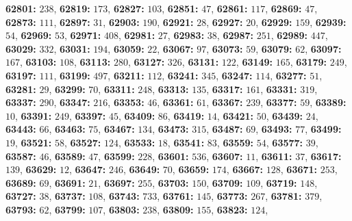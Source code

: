 \textsf{\bfseries 62801:} $238$, \textsf{\bfseries 62819:} $173$, \textsf{\bfseries 62827:} $103$, \textsf{\bfseries 62851:} $47$, \textsf{\bfseries 62861:} $117$, \textsf{\bfseries 62869:} $47$, \textsf{\bfseries 62873:} $111$, \textsf{\bfseries 62897:} $31$, \textsf{\bfseries 62903:} $190$, \textsf{\bfseries 62921:} $28$, \textsf{\bfseries 62927:} $20$, \textsf{\bfseries 62929:} $159$, \textsf{\bfseries 62939:} $54$, \textsf{\bfseries 62969:} $53$, \textsf{\bfseries 62971:} $408$, \textsf{\bfseries 62981:} $27$, \textsf{\bfseries 62983:} $38$, \textsf{\bfseries 62987:} $251$, \textsf{\bfseries 62989:} $447$, \textsf{\bfseries 63029:} $332$, \textsf{\bfseries 63031:} $194$, \textsf{\bfseries 63059:} $22$, \textsf{\bfseries 63067:} $97$, \textsf{\bfseries 63073:} $59$, \textsf{\bfseries 63079:} $62$, \textsf{\bfseries 63097:} $167$, \textsf{\bfseries 63103:} $108$, \textsf{\bfseries 63113:} $280$, \textsf{\bfseries 63127:} $326$, \textsf{\bfseries 63131:} $122$, \textsf{\bfseries 63149:} $165$, \textsf{\bfseries 63179:} $249$, \textsf{\bfseries 63197:} $111$, \textsf{\bfseries 63199:} $497$, \textsf{\bfseries 63211:} $112$, \textsf{\bfseries 63241:} $345$, \textsf{\bfseries 63247:} $114$, \textsf{\bfseries 63277:} $51$, \textsf{\bfseries 63281:} $29$, \textsf{\bfseries 63299:} $70$, \textsf{\bfseries 63311:} $248$, \textsf{\bfseries 63313:} $135$, \textsf{\bfseries 63317:} $161$, \textsf{\bfseries 63331:} $319$, \textsf{\bfseries 63337:} $290$, \textsf{\bfseries 63347:} $216$, \textsf{\bfseries 63353:} $46$, \textsf{\bfseries 63361:} $61$, \textsf{\bfseries 63367:} $239$, \textsf{\bfseries 63377:} $59$, \textsf{\bfseries 63389:} $10$, \textsf{\bfseries 63391:} $249$, \textsf{\bfseries 63397:} $45$, \textsf{\bfseries 63409:} $86$, \textsf{\bfseries 63419:} $14$, \textsf{\bfseries 63421:} $50$, \textsf{\bfseries 63439:} $24$, \textsf{\bfseries 63443:} $66$, \textsf{\bfseries 63463:} $75$, \textsf{\bfseries 63467:} $134$, \textsf{\bfseries 63473:} $315$, \textsf{\bfseries 63487:} $69$, \textsf{\bfseries 63493:} $77$, \textsf{\bfseries 63499:} $19$, \textsf{\bfseries 63521:} $58$, \textsf{\bfseries 63527:} $124$, \textsf{\bfseries 63533:} $18$, \textsf{\bfseries 63541:} $83$, \textsf{\bfseries 63559:} $54$, \textsf{\bfseries 63577:} $39$, \textsf{\bfseries 63587:} $46$, \textsf{\bfseries 63589:} $47$, \textsf{\bfseries 63599:} $228$, \textsf{\bfseries 63601:} $536$, \textsf{\bfseries 63607:} $11$, \textsf{\bfseries 63611:} $37$, \textsf{\bfseries 63617:} $139$, \textsf{\bfseries 63629:} $12$, \textsf{\bfseries 63647:} $246$, \textsf{\bfseries 63649:} $70$, \textsf{\bfseries 63659:} $174$, \textsf{\bfseries 63667:} $128$, \textsf{\bfseries 63671:} $253$, \textsf{\bfseries 63689:} $69$, \textsf{\bfseries 63691:} $21$, \textsf{\bfseries 63697:} $255$, \textsf{\bfseries 63703:} $150$, \textsf{\bfseries 63709:} $109$, \textsf{\bfseries 63719:} $148$, \textsf{\bfseries 63727:} $38$, \textsf{\bfseries 63737:} $108$, \textsf{\bfseries 63743:} $733$, \textsf{\bfseries 63761:} $145$, \textsf{\bfseries 63773:} $267$, \textsf{\bfseries 63781:} $379$, \textsf{\bfseries 63793:} $62$, \textsf{\bfseries 63799:} $107$, \textsf{\bfseries 63803:} $238$, \textsf{\bfseries 63809:} $155$, \textsf{\bfseries 63823:} $124$, 

